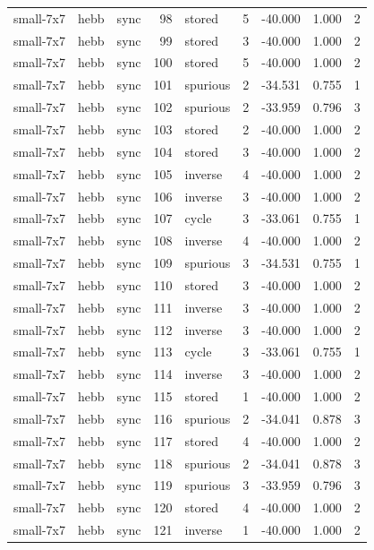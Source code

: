 \begin{tabular}{lllrlrrrr}
small-7x7 & hebb & sync & 98 & stored & 5 & -40.000 & 1.000 & 2 \\
small-7x7 & hebb & sync & 99 & stored & 3 & -40.000 & 1.000 & 2 \\
small-7x7 & hebb & sync & 100 & stored & 5 & -40.000 & 1.000 & 2 \\
small-7x7 & hebb & sync & 101 & spurious & 2 & -34.531 & 0.755 & 1 \\
small-7x7 & hebb & sync & 102 & spurious & 2 & -33.959 & 0.796 & 3 \\
small-7x7 & hebb & sync & 103 & stored & 2 & -40.000 & 1.000 & 2 \\
small-7x7 & hebb & sync & 104 & stored & 3 & -40.000 & 1.000 & 2 \\
small-7x7 & hebb & sync & 105 & inverse & 4 & -40.000 & 1.000 & 2 \\
small-7x7 & hebb & sync & 106 & inverse & 3 & -40.000 & 1.000 & 2 \\
small-7x7 & hebb & sync & 107 & cycle & 3 & -33.061 & 0.755 & 1 \\
small-7x7 & hebb & sync & 108 & inverse & 4 & -40.000 & 1.000 & 2 \\
small-7x7 & hebb & sync & 109 & spurious & 3 & -34.531 & 0.755 & 1 \\
small-7x7 & hebb & sync & 110 & stored & 3 & -40.000 & 1.000 & 2 \\
small-7x7 & hebb & sync & 111 & inverse & 3 & -40.000 & 1.000 & 2 \\
small-7x7 & hebb & sync & 112 & inverse & 3 & -40.000 & 1.000 & 2 \\
small-7x7 & hebb & sync & 113 & cycle & 3 & -33.061 & 0.755 & 1 \\
small-7x7 & hebb & sync & 114 & inverse & 3 & -40.000 & 1.000 & 2 \\
small-7x7 & hebb & sync & 115 & stored & 1 & -40.000 & 1.000 & 2 \\
small-7x7 & hebb & sync & 116 & spurious & 2 & -34.041 & 0.878 & 3 \\
small-7x7 & hebb & sync & 117 & stored & 4 & -40.000 & 1.000 & 2 \\
small-7x7 & hebb & sync & 118 & spurious & 2 & -34.041 & 0.878 & 3 \\
small-7x7 & hebb & sync & 119 & spurious & 3 & -33.959 & 0.796 & 3 \\
small-7x7 & hebb & sync & 120 & stored & 4 & -40.000 & 1.000 & 2 \\
small-7x7 & hebb & sync & 121 & inverse & 1 & -40.000 & 1.000 & 2 \\

\end{tabular}
